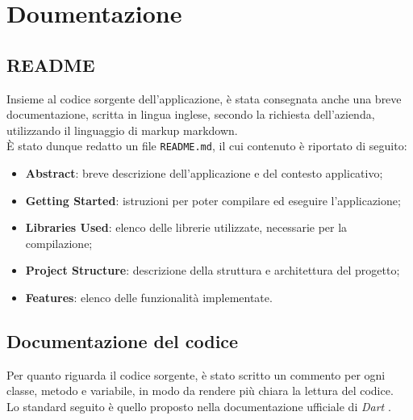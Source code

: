

\section{Doumentazione}
\label{sec:documentation}

\subsection*{README}
\label{sec:readme}

Insieme al codice sorgente dell'applicazione, è stata consegnata anche una breve documentazione, scritta in lingua inglese, secondo la richiesta dell'azienda, utilizzando il linguaggio di markup \gls{markdown}\glsoccur.\\
È stato dunque redatto un file \lstinline{README.md}, il cui contenuto è riportato di seguito:
\begin{itemize}
    \item \textbf{Abstract}: breve descrizione dell'applicazione e del contesto applicativo;
    \item \textbf{Getting Started}: istruzioni per poter compilare ed eseguire l'applicazione;
    \item \textbf{Libraries Used}: elenco delle librerie utilizzate, necessarie per la compilazione;
    \item \textbf{Project Structure}: descrizione della struttura e architettura del progetto;
    \item \textbf{Features}: elenco delle funzionalità implementate.
\end{itemize}


\subsection*{Documentazione del codice}
\label{sec:documentazione-codice}

Per quanto riguarda il codice sorgente, è stato scritto un commento per ogni classe, metodo e variabile, in modo da rendere più chiara la lettura del codice.\\
Lo standard seguito è quello proposto nella documentazione ufficiale di \emph{Dart} \cite{site:comment}. \\

